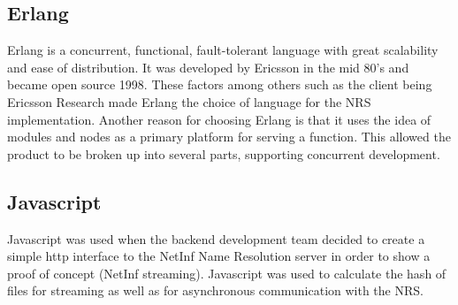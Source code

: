 \subsection{Erlang}
Erlang is a concurrent, functional, fault-tolerant language with great scalability and ease of distribution. It was developed by Ericsson in the mid 80's and became open source 1998.\cite{otpInAction} These factors among others such as the client being Ericsson Research made Erlang the choice of language for the NRS implementation.
Another reason for choosing Erlang is that it uses the idea of modules and nodes as a primary platform for serving a function. This allowed the product to be broken up into several parts, supporting concurrent development.
\subsection{Javascript}
Javascript was used when the backend development team decided to create a simple http interface to the NetInf Name Resolution server in order to show a proof of concept (NetInf streaming). Javascript was used to calculate the hash of files for streaming as well as for asynchronous communication with the NRS.

